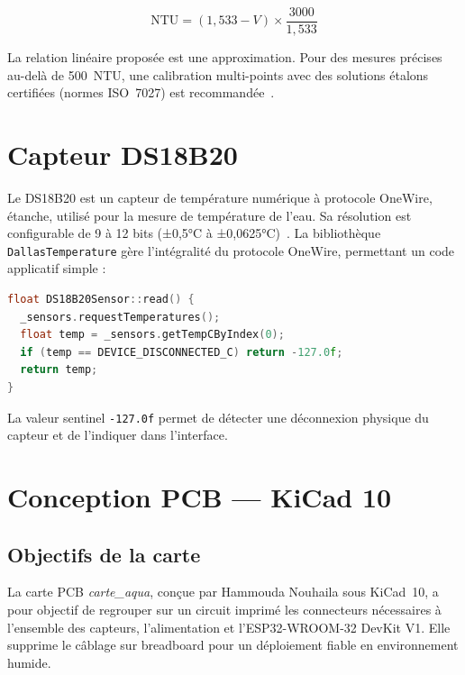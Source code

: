 \documentclass[12pt,a4paper]{report}
\newcommand{\code}[1]{\texttt{\small\colorbox{codebg}{#1}}}
\begin{document}
\begin{equation}
\text{NTU} = \left(1{,}533 - V\right) \times \frac{3000}{1{,}533}
\label{eq:ntu_conv}
\end{equation}

\begin{warningbox}
La relation linéaire proposée est une approximation. Pour des mesures précises
au-delà de 500~NTU, une calibration multi-points avec des solutions étalons
certifiées (normes ISO~7027) est recommandée~\cite{camargo2023lowcost}.
\end{warningbox}

\section{Capteur DS18B20}

Le DS18B20 est un capteur de température numérique à protocole OneWire, étanche, utilisé
pour la mesure de température de l'eau. Sa résolution est configurable de 9 à 12 bits
(±0,5°C à ±0,0625°C)~\cite{ds18b20}. La bibliothèque \code{DallasTemperature} gère
l'intégralité du protocole OneWire, permettant un code applicatif simple :

\begin{lstlisting}[language=C++,caption={Lecture DS18B20 -- ds18b20\_sensor.cpp}]
float DS18B20Sensor::read() {
  _sensors.requestTemperatures();
  float temp = _sensors.getTempCByIndex(0);
  if (temp == DEVICE_DISCONNECTED_C) return -127.0f;
  return temp;
}
\end{lstlisting}

La valeur sentinel \code{-127.0f} permet de détecter une déconnexion physique du capteur
et de l'indiquer dans l'interface.

\section{Conception PCB --- KiCad 10}

\subsection{Objectifs de la carte}

La carte PCB \textit{carte\_aqua}, conçue par Hammouda Nouhaila sous KiCad~10, a pour
objectif de regrouper sur un circuit imprimé les connecteurs nécessaires à l'ensemble
des capteurs, l'alimentation et l'ESP32-WROOM-32 DevKit V1. Elle supprime le câblage
sur breadboard pour un déploiement fiable en environnement humide.
\end{document}
